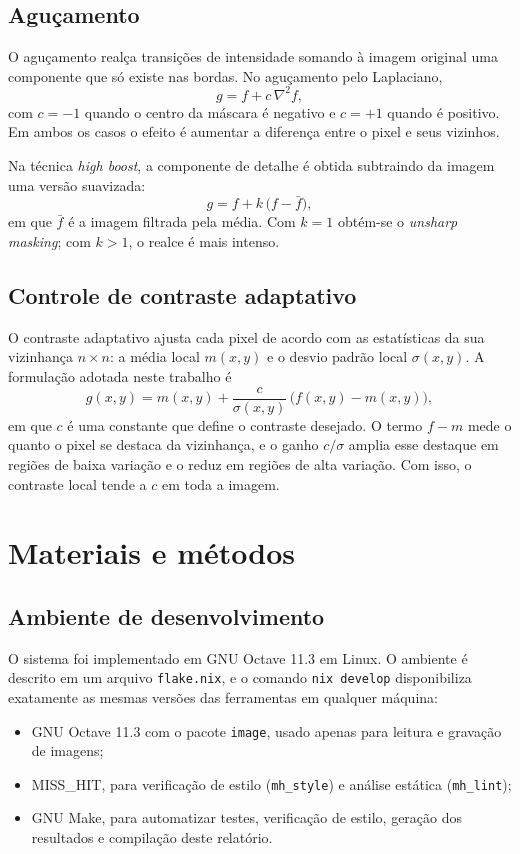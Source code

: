 \documentclass[11pt,a4paper]{article}
\begin{document}
\subsection{Aguçamento}

O aguçamento realça transições de intensidade somando à imagem original uma componente que só existe nas bordas. No aguçamento pelo Laplaciano,
\begin{equation}
g = f + c\,\nabla^2 f,
\end{equation}
com $c=-1$ quando o centro da máscara é negativo e $c=+1$ quando é positivo. Em ambos os casos o efeito é aumentar a diferença entre o pixel e seus vizinhos.

Na técnica \emph{high boost}, a componente de detalhe é obtida subtraindo da imagem uma versão suavizada:
\begin{equation}
g = f + k\,\big(f - \bar{f}\big),
\end{equation}
em que $\bar f$ é a imagem filtrada pela média. Com $k=1$ obtém-se o \emph{unsharp masking}; com $k>1$, o realce é mais intenso.

\subsection{Controle de contraste adaptativo}

O contraste adaptativo ajusta cada pixel de acordo com as estatísticas da sua vizinhança $n\times n$: a média local $m(x,y)$ e o desvio padrão local $\sigma(x,y)$. A formulação adotada neste trabalho é
\begin{equation}
g(x,y) = m(x,y) + \frac{c}{\sigma(x,y)}\,\big(f(x,y) - m(x,y)\big),
\end{equation}
em que $c$ é uma constante que define o contraste desejado. O termo $f - m$ mede o quanto o pixel se destaca da vizinhança, e o ganho $c/\sigma$ amplia esse destaque em regiões de baixa variação e o reduz em regiões de alta variação. Com isso, o contraste local tende a $c$ em toda a imagem.

\section{Materiais e métodos}

\subsection{Ambiente de desenvolvimento}

O sistema foi implementado em GNU Octave 11.3 em Linux. O ambiente é descrito em um arquivo \texttt{flake.nix}, e o comando \texttt{nix develop} disponibiliza exatamente as mesmas versões das ferramentas em qualquer máquina:
\begin{itemize}
  \item GNU Octave 11.3 com o pacote \texttt{image}, usado apenas para leitura e gravação de imagens;
  \item MISS\_HIT, para verificação de estilo (\texttt{mh\_style}) e análise estática (\texttt{mh\_lint});
  \item GNU Make, para automatizar testes, verificação de estilo, geração dos resultados e compilação deste relatório.
\end{itemize}
\end{document}
